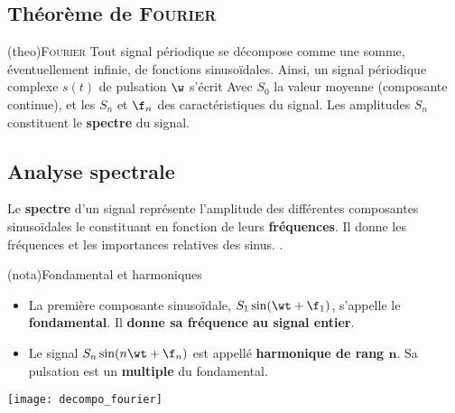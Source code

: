 \documentclass[../../main/main.tex]{subfiles}
\begin{document}
\subsection{Théorème de \textsc{Fourier}}
\begin{tcb*}[breakable](theo){\textsc{Fourier}}
	Tout signal périodique se décompose comme une somme, éventuellement infinie,
	de fonctions sinusoïdales. Ainsi, un signal périodique complexe $s(t)$ de
	pulsation $\w$ s'écrit
	\psw{
		\[
			s(t) = S_0 + \sum_{n=1}^{+\infty} S_n \sin(n\w t + \f_n)
			\Lra
			s(t) = S_0 + \sum_{n=1}^{+\infty} S_n \sin(2\pi nf t + \f_n)
		\]
	}%
	Avec $S_0$ la valeur moyenne (composante continue), et les $S_n$ et $\f_n$ des
	caractéristiques du signal. Les amplitudes $S_n$ constituent le
	\textbf{spectre} du signal.
\end{tcb*}

\subsection{Analyse spectrale}

\noindent
\begin{minipage}[t]{.48\linewidth}
	Le \textbf{spectre} d’un signal représente l’amplitude des différentes
	composantes sinusoïdales le constituant en fonction de leurs
	\textbf{fréquences}. Il donne les fréquences et les importances relatives des
	sinus. .
	\begin{tcb}(nota){Fondamental et harmoniques}
		\begin{itemize}
			\item La première composante sinusoïdale, $S_1 \sin(\wt + \f_1)$,
			      s'appelle le \textbf{fondamental}. Il \textbf{donne sa fréquence au
				      signal entier}.
			\item Le signal $S_n \sin(n\wt + \f_n)$ est appellé
			      \textbf{harmonique de rang $\mathbf{n}$}. Sa pulsation est un
			      \textbf{multiple} du fondamental.
		\end{itemize}
	\end{tcb}
\end{minipage}
\hfill
\begin{minipage}[t]{.48\linewidth}
	\vspace{-10pt}
	\begin{center}
		\texttt{[image: decompo\_fourier]}
		\label{fig:fourier}
	\end{center}
\end{minipage}
\end{document}
